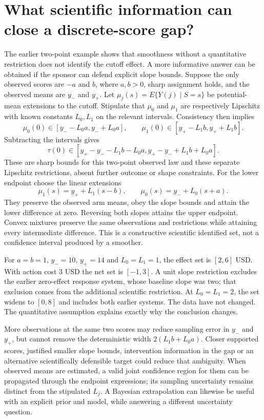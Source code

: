 \section{What scientific information can close a discrete-score gap?}
\label{exec17:s4-gap-bounds}

The earlier two-point example shows that smoothness without a quantitative
restriction does not identify the cutoff effect. A more informative answer
can be obtained if the sponsor can defend explicit slope bounds. Suppose
the only observed scores are $-a$ and $b$, where $a,b>0$, sharp assignment
holds, and the observed means are $y_-$ and $y_+$. Let
$\mu_j(s)=E\{Y(j)\mid S=s\}$ be potential-mean extensions to the cutoff.
Stipulate that $\mu_0$ and $\mu_1$ are respectively Lipschitz with known
constants $L_0,L_1$ on the relevant intervals. Consistency then implies
\[
 \mu_0(0)\in[y_- -L_0a,y_-+L_0a],\qquad
 \mu_1(0)\in[y_+-L_1b,y_++L_1b].
\]
Subtracting the intervals gives
\begin{equation}
 \tau(0)\in[y_+-y_- -L_1b-L_0a,
             y_+-y_- +L_1b+L_0a].
 \label{exec17:s4-gap-sharp}
\end{equation}
These are sharp bounds for this two-point observed law and these separate
Lipschitz restrictions, absent further outcome or shape constraints.
For the lower endpoint choose the linear extensions
\[
 \mu_1(s)=y_++L_1(s-b),\qquad
 \mu_0(s)=y_-+L_0(s+a).
\]
They preserve the observed arm means, obey the slope bounds and attain the
lower difference at zero. Reversing both slopes attains the upper endpoint.
Convex mixtures preserve the same observations and restrictions while
attaining every intermediate difference. This is a constructive scientific
identified set, not a confidence interval produced by a smoother.
\citep{exec17_s4_extension}

For $a=b=1$, $y_-=10$, $y_+=14$ and $L_0=L_1=1$, the effect set is
$[2,6]$ USD. With action cost $3$ USD the net set is $[-1,3]$. A unit
slope restriction excludes the earlier zero-effect response system, whose
baseline slope was two; that exclusion comes from the additional scientific
restriction. At $L_0=L_1=2$, the set widens to $[0,8]$ and includes both
earlier systems. The data have not changed. The quantitative assumption
explains exactly why the conclusion changes.

More observations at the same two scores may reduce sampling error in
$y_-$ and $y_+$, but cannot remove the deterministic width
$2(L_1b+L_0a)$. Closer supported scores, justified smaller slope bounds,
intervention information in the gap or an alternative scientifically
defensible target could reduce that ambiguity. When observed means are
estimated, a valid joint confidence region for them can be propagated
through the endpoint expressions; its sampling uncertainty remains distinct
from the stipulated $L_j$. A Bayesian extrapolation can likewise be useful
with an explicit prior and model, while answering a different uncertainty
question.

